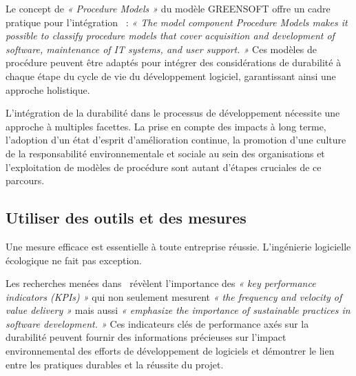 Le concept de \emph{« Procedure Models »} du modèle GREENSOFT offre un cadre pratique pour l'intégration~\cite{GreenSoftModel} : \emph{« The model component Procedure Models makes it possible to classify procedure models that cover acquisition and development of software, maintenance of IT systems, and user support. »} Ces modèles de procédure peuvent être adaptés pour intégrer des considérations de durabilité à chaque étape du cycle de vie du développement logiciel, garantissant ainsi une approche holistique.


L'intégration de la durabilité dans le processus de développement nécessite une approche à multiples facettes. La prise en compte des impacts à long terme, l'adoption d'un état d'esprit d'amélioration continue, la promotion d'une culture de la responsabilité environnementale et sociale au sein des organisations et l'exploitation de modèles de procédure sont autant d'étapes cruciales de ce parcours.


\subsection{Utiliser des outils et des mesures}
Une mesure efficace est essentielle à toute entreprise réussie. L'ingénierie logicielle écologique ne fait pas exception.


Les recherches menées dans~\cite{IntegrationSustainabilityMetrics} révèlent l'importance des \emph{« key performance indicators (KPIs) »} qui non seulement mesurent \emph{« the frequency and velocity of value delivery »} mais aussi \emph{« emphasize the importance of sustainable practices in software development. »}  Ces indicateurs clés de performance axés sur la durabilité peuvent fournir des informations précieuses sur l'impact environnemental des efforts de développement de logiciels et démontrer le lien entre les pratiques durables et la réussite du projet.


